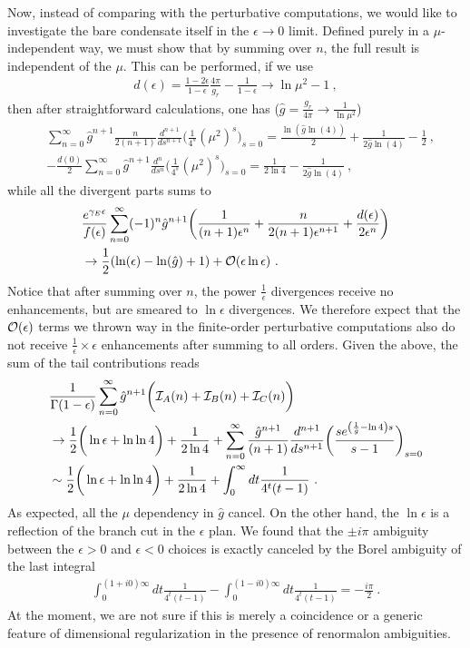 \documentclass[a4paper,11pt]{article}
\begin{document}
Now, instead of comparing with the perturbative computations, we would like to investigate the bare condensate itself in the $\epsilon \rightarrow 0$ limit. Defined purely in a $\mu$-independent way, we must show that by summing over $n$, the full result is independent of the $\mu$. This can be performed, if we use
\begin{align}
d(\epsilon)=\frac{1-2\epsilon}{1-\epsilon}\frac{4\pi}{g_r}-\frac{1}{1-\epsilon} \rightarrow \ln \mu^2-1\ ,
\end{align}
then after straightforward calculations, one has ($\hat g=\frac{g_r}{4\pi}\rightarrow\frac{1}{\ln \mu^2}$)
\begin{align}
& \sum_{n=0}^{\infty}\hat g^{n+1}\frac{n}{2(n+1)}\frac{d^{n+1}}{ds^{n+1}}\bigg(\frac{1}{4^s}(\mu^2)^s\bigg)_{s=0}=\frac{ \ln (\hat g \ln (4))}{2}+\frac{1}{2\hat g \ln (4)}-\frac{1}{2} \ , \\
&-\frac{d(0)}{2}\sum_{n=0}^{\infty}\hat g^{n+1}\frac{d^{n}}{ds^{n}}\bigg(\frac{1}{4^s}(\mu^2)^s\bigg)_{s=0}=\frac{1}{2\ln 4}-\frac{1}{2\hat g \ln (4)} \ , 
\end{align}
while all the divergent parts sums to
\begin{align}
&\frac{e^{\gamma_E\epsilon}}{f(\epsilon)}\sum_{n=0}^{\infty}(-1)^n\hat g^{n+1}\bigg(\frac{1}{(n+1)\epsilon^n}+\frac{n}{2(n+1)\epsilon^{n+1}}+\frac{d(\epsilon)}{2\epsilon^n}\bigg)\nonumber \\ 
&\rightarrow \frac{1}{2} (\ln (\epsilon)-\ln (\hat g)+1)+{\cal O}(\epsilon\ln \epsilon) \ .
\end{align}
Notice that after summing over $n$, the power $\frac{1}{\epsilon}$ divergences receive no enhancements, but are smeared to $\ln \epsilon$ divergences. We therefore expect that the ${\cal O}(\epsilon)$ terms we thrown way in the finite-order perturbative computations also do not receive $\frac{1}{\epsilon}\times\epsilon$ enhancements after summing to all orders. Given the above, the sum of the tail contributions reads
\begin{align}
&\frac{1}{\Gamma(1-\epsilon)}\sum_{n=0}^{\infty}\hat g^{n+1}\bigg({\cal I}_A(n)+{\cal I}_B(n)+{\cal I}_C(n)\bigg)\nonumber \\ 
&\rightarrow \frac{1}{2}\bigg(\ln \epsilon+\ln \ln 4\bigg)+\frac{1}{2\ln 4}+\sum_{n=0}^{\infty}\frac{\hat g^{n+1}}{(n+1)}\frac{d^{n+1}}{ds^{n+1}}\bigg(\frac{se^{\left(\frac{1}{\hat g}-\ln4\right)s}}{s-1}\bigg)_{s=0} \nonumber \\ 
& \sim  \frac{1}{2}\bigg(\ln \epsilon+\ln \ln 4\bigg)+\frac{1}{2\ln 4}+\int_0^{\infty} dt \frac{1}{4^t(t-1)}\ .
\end{align}
As expected, all the $\mu$ dependency in $\hat g$ cancel. On the other hand, the $\ln \epsilon$ is a reflection of the branch cut in the $\epsilon$ plan. We found that the $\pm i\pi$ ambiguity between the $\epsilon>0$ and $\epsilon<0$ choices is exactly canceled by the Borel ambiguity of the last integral
\begin{align}
\int_0^{(1+i0)\infty} dt \frac{1}{4^t(t-1)}-\int_0^{(1-i0)\infty} dt \frac{1}{4^t(t-1)}=-\frac{i\pi}{2} \ .
\end{align}
At the moment, we are not sure if this is merely a coincidence or a generic feature of dimensional regularization in the presence of renormalon ambiguities. 
\end{document}
